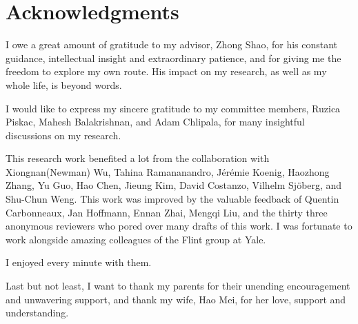 

\chapter*{Acknowledgments}
\thispagestyle{empty}

I owe a great amount of gratitude to my advisor, Zhong Shao, for
his constant guidance, intellectual insight and extraordinary patience,
and for giving me the freedom to explore my own route.
His impact on my research, as well as my whole life, is beyond words.

I would like to express my sincere gratitude to my committee members,
Ruzica Piskac, Mahesh Balakrishnan, and Adam Chlipala, for many insightful
discussions on my research.

This research work benefited a lot from 
the collaboration with Xiongnan(Newman) Wu,
Tahina Ramananandro,
J\'{e}r\'{e}mie Koenig,
Haozhong Zhang,
Yu Guo,
Hao Chen,
Jieung Kim,
David Costanzo,
Vilhelm Sj\"{o}berg,
and Shu-Chun Weng.
This work was improved by the valuable feedback of 
Quentin Carbonneaux,
Jan Hoffmann,
Ennan Zhai, Mengqi Liu,
and the thirty three anonymous reviewers who pored over many drafts
of this work.
I was fortunate to work alongside 
amazing colleagues of the Flint group at Yale. 
I enjoyed every minute with them.

Last but not least, I want to thank my parents 
for their unending encouragement and unwavering support, 
and thank my wife, Hao Mei,
for her love, support and understanding.

\clearpage
